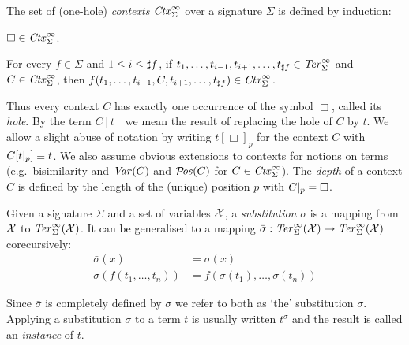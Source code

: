 \begin{definition}%
The set of (one-hole) \emph{contexts} $\mathit{Ctx}_\Sigma^\infty$ over a signature
$\Sigma$ is defined by induction:
\begin{compactenum}
  \item
    $\Box \in \mathit{Ctx}_\Sigma^\infty$.
  \item
    For every $f \in \Sigma$ and $1 \le i \le \sharp f$, if $t_1,
    \ldots, t_{i - 1}, t_{i + 1}, \ldots, t_{\sharp f} \in \mathit{Ter}_\Sigma^\infty$ and
    $C \in \mathit{Ctx}_\Sigma^\infty$, then $f(t_1, \ldots, t_{i - 1}, C, t_{i + 1},
    \ldots, t_{\sharp f}) \in \mathit{Ctx}_\Sigma^\infty$.
\end{compactenum}
\end{definition}

Thus every context $C$ has exactly one occurrence of the symbol $\Box$, called
its \emph{hole}. By the term $C[t]$ we mean the result of replacing the hole
of $C$ by $t$. We allow a slight abuse of notation by writing
$t[\Box]_p$ for the context $C$ with $C[t |_{p}] \equiv t$. We
also assume obvious extensions to contexts for notions on terms
(e.g.\ bisimilarity and $\mathit{Var}(C)$ and $\mathcal{P}\!\mathit{os}(C)$ for $C \in \mathit{Ctx}_\Sigma^\infty$).
The \emph{depth} of a context $C$ is defined by the length of the
(unique) position $p$ with $C |_{p} = \Box$.


\begin{definition}%
Given a signature $\Sigma$ and a set of variables $\mathcal{X}$, a
\emph{substitution} $\sigma$ is a mapping from $\mathcal{X}$ to $\mathit{Ter}_\Sigma^\infty(\mathcal{X})$. It
can be generalised to a mapping $\bar{\sigma} : \mathit{Ter}_\Sigma^\infty(\mathcal{X}) \rightarrow
\mathit{Ter}_\Sigma^\infty(\mathcal{X})$ corecursively:
\begin{align*}
  \bar{\sigma}(x) &= \sigma(x)\\
  \bar{\sigma}(f(t_1, \ldots, t_n)) &= f(\bar{\sigma}(t_1), \ldots,
  \bar{\sigma}(t_n))
\end{align*}
\end{definition}

Since $\bar{\sigma}$ is completely defined by $\sigma$ we refer to both as
`the' substitution $\sigma$.
Applying a substitution $\sigma$ to a term $t$ is usually written
$t^\sigma$ and the result is called an \emph{instance} of $t$.

